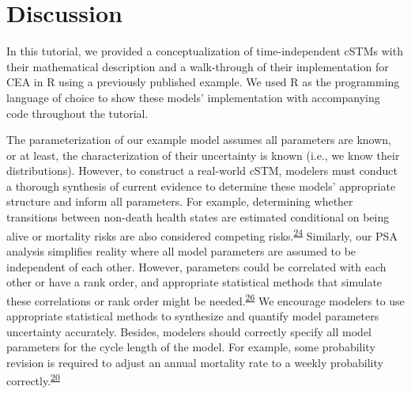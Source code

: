 \documentclass[
]{article}
\begin{document}
\hypertarget{discussion}{%
\section{Discussion}\label{discussion}}

In this tutorial, we provided a conceptualization of time-independent cSTMs with their mathematical description and a walk-through of their implementation for CEA in R using a previously published example. We used R as the programming language of choice to show these models' implementation with accompanying code throughout the tutorial.

The parameterization of our example model assumes all parameters are known, or at least, the characterization of their uncertainty is known (i.e., we know their distributions). However, to construct a real-world cSTM, modelers must conduct a thorough synthesis of current evidence to determine these models' appropriate structure and inform all parameters. For example, determining whether transitions between non-death health states are estimated conditional on being alive or mortality risks are also considered competing risks.\textsuperscript{\protect\hyperlink{ref-Briggs2012}{24}} Similarly, our PSA analysis simplifies reality where all model parameters are assumed to be independent of each other. However, parameters could be correlated with each other or have a rank order, and appropriate statistical methods that simulate these correlations or rank order might be needed.\textsuperscript{\protect\hyperlink{ref-Goldhaber-Fiebert2015}{26}} We encourage modelers to use appropriate statistical methods to synthesize and quantify model parameters uncertainty accurately. Besides, modelers should correctly specify all model parameters for the cycle length of the model. For example, some probability revision is required to adjust an annual mortality rate to a weekly probability correctly.\textsuperscript{\protect\hyperlink{ref-Hunink2014}{20}}
\end{document}
